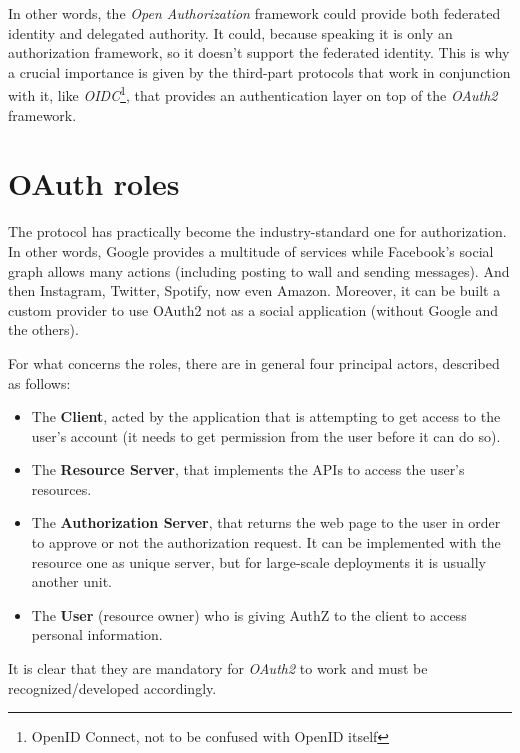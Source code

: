 In other words, the \textit{Open Authorization} framework could provide both federated identity and delegated authority. It could, because speaking it is only an authorization framework, so it doesn't support the federated identity. This is why a crucial importance is given by the third-part protocols that work in conjunction with it, like \textit{OIDC}\footnote{OpenID Connect, not to be confused with OpenID itself}, that provides an authentication layer on top of the \textit{OAuth2} framework.


\section{OAuth roles}
The protocol has practically become the industry-standard one for authorization. In other words, Google provides a multitude of services while Facebook's social graph allows many actions (including posting to wall and sending messages). And then Instagram, Twitter, Spotify, now even Amazon. Moreover, it can be built a custom provider to use OAuth2 not as a social application (without Google and the others).

For what concerns the roles, there are in general four principal actors, described as follows:


\begin{itemize}
    \item The \textbf{Client}, acted by the application that is attempting to get access to the user's account (it needs to get permission from the user before it can do so).
    \item The \textbf{Resource Server}, that implements the APIs to access the user's resources.
    \item The \textbf{Authorization Server}, that returns the web page to the user in order to approve or not the authorization request. It can be implemented with the resource one as unique server, but for large-scale deployments it is usually another unit.
    \item The \textbf{User} (resource owner) who is giving AuthZ to the client to access personal information.
\end{itemize}

It is clear that they are mandatory for \textit{OAuth2} to work and must be recognized/developed accordingly. 



\vspace{0.5cm}
